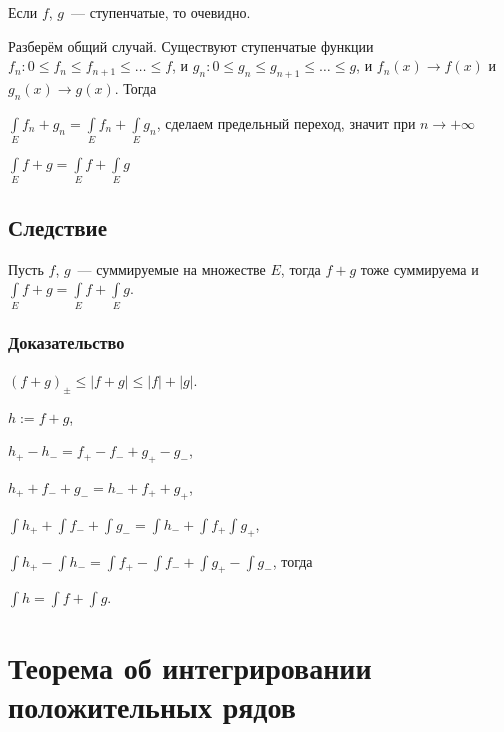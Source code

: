 \documentclass{article}
\begin{document}
            Если $f$, $g$~--- ступенчатые, то очевидно.
            
            Разберём общий случай. Существуют ступенчатые функции $f_n : 0 \leqslant f_n \leqslant f_{n + 1} \leqslant \ldots \leqslant f$, и $g_n : 0 \leqslant g_n \leqslant g_{n + 1} \leqslant \ldots \leqslant g$, и $f_n(x) \rightarrow f(x)$ и $g_n(x) \rightarrow g(x)$. Тогда
            
            $\int\limits_{E} f_n + g_n = \int\limits_{E} f_n + \int\limits_{E} g_n$, сделаем предельный переход, значит при $n \rightarrow +\infty$
            
            $\int\limits_{E} f + g = \int\limits_{E} f + \int\limits_{E} g$
            
        \subsection{Следствие}
        
            Пусть $f$, $g$~--- суммируемые на множестве $E$, тогда $f + g$ тоже суммируема и $\int\limits_{E} f + g = \int\limits_{E} f + \int\limits_{E} g$.
            
            \subsubsection{Доказательство}
            
                $(f + g)_{\pm} \leqslant | f + g | \leqslant |f| + |g|$.
                
                $h := f + g$,
                
                $h_+ - h_- = f_+ - f_- + g_+ - g_-$,
                
                $h_+ + f_- + g_- = h_- + f_+ + g_+$,
                
                $\int h_+ + \int f_- + \int g_- = \int h_- + \int f_+ \int g_+$,
                
                $\int h_+ - \int h_- = \int f_+ - \int f_- + \int g_+ - \int g_-$, тогда
                
                $\int h = \int f + \int g$.
    
    \newpage
        
    \section{Теорема об интегрировании положительных рядов}
    
\end{document}
